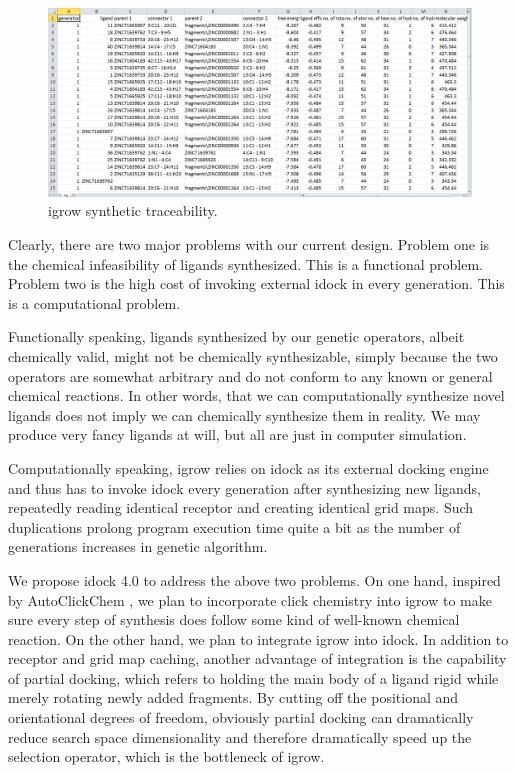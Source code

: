 \documentclass[10pt, conference, compsocconf]{IEEEtran}
\begin{document}
\begin{figure}
\centering
\includegraphics[width=\textwidth]{../igrow/SyntheticTraceability.png}
\caption{igrow synthetic traceability.}
\label{igrow:SyntheticTraceability}
\end{figure}

Clearly, there are two major problems with our current design. Problem one is the chemical infeasibility of ligands synthesized. This is a functional problem. Problem two is the high cost of invoking external idock in every generation. This is a computational problem.

Functionally speaking, ligands synthesized by our genetic operators, albeit chemically valid, might not be chemically synthesizable, simply because the two operators are somewhat arbitrary and do not conform to any known or general chemical reactions. In other words, that we can computationally synthesize novel ligands does not imply we can chemically synthesize them in reality. We may produce very fancy ligands at will, but all are just in computer simulation.

Computationally speaking, igrow relies on idock as its external docking engine and thus has to invoke idock every generation after synthesizing new ligands, repeatedly reading identical receptor and creating identical grid maps. Such duplications prolong program execution time quite a bit as the number of generations increases in genetic algorithm.

We propose idock 4.0 to address the above two problems. On one hand, inspired by AutoClickChem \citep{1051}, we plan to incorporate click chemistry into igrow to make sure every step of synthesis does follow some kind of well-known chemical reaction. On the other hand, we plan to integrate igrow into idock. In addition to receptor and grid map caching, another advantage of integration is the capability of partial docking, which refers to holding the main body of a ligand rigid while merely rotating newly added fragments. By cutting off the positional and orientational degrees of freedom, obviously partial docking can dramatically reduce search space dimensionality and therefore dramatically speed up the selection operator, which is the bottleneck of igrow.
\end{document}
